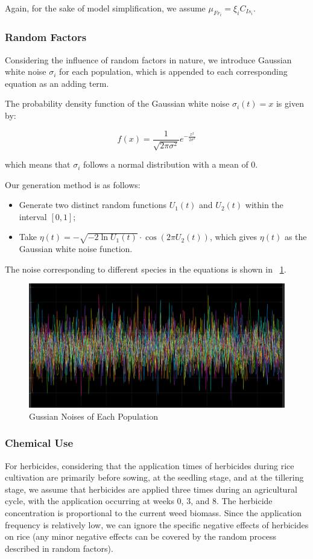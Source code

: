 \documentclass{HZNUMCM}
\begin{document}
        Again, for the sake of model simplification, we assume \( \mu_{Fr_i} = \xi_{i} C_{Is_i} \).
      \subsubsection{Random Factors}
        Considering the influence of random factors in nature, we introduce Gaussian white noise $\sigma_i$ for each population, which is appended to each corresponding equation as an adding term.
        
        The probability density function of the Gaussian white noise \(\sigma_i(t) = x\) is given by:

        \begin{equation}
        f(x) = \frac{1}{\sqrt{2\pi\sigma^2}} e^{-\frac{x^2}{2\sigma^2}}
        \end{equation}

        which means that \(\sigma_i\) follows a normal distribution with a mean of 0.
        
        Our generation method is as follows:
        \begin{itemize}
            \item Generate two distinct random functions \(U_1(t)\) and \(U_2(t)\) within the interval \([0, 1]\);
            \item Take \(\eta(t) = -\sqrt{-2 \ln U_1(t)} \cdot \cos(2\pi U_2(t))\), which gives \(\eta(t)\) as the Gaussian white noise function.
        \end{itemize}
        The noise corresponding to different species in the equations is shown in \figurename~\ref{fig:GussianNoise}.
        \begin{figure}[H]
          \centering
          \includegraphics[width=0.5\linewidth]{images/GussianNoise.png}
          \caption{Gussian Noises of Each Population}
          \label{fig:GussianNoise}
        \end{figure}
      \subsubsection{Chemical Use}
        For herbicides, considering that the application times of herbicides during rice cultivation are primarily before sowing, 
        at the seedling stage, and at the tillering stage, we assume that herbicides are applied three times during an agricultural cycle, 
        with the application occurring at weeks 0, 3, and 8. The herbicide concentration is proportional to the current weed biomass. 
        Since the application frequency is relatively low, we can ignore the specific negative effects of herbicides on rice 
        (any minor negative effects can be covered by the random process described in random factors).
\end{document}

